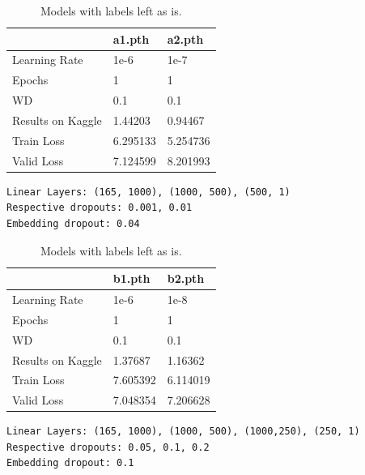 \documentclass[10pt,twocolumn,letterpaper]{article}
\begin{document}
\begin{table}[]
  \begin{center}
    \tabcolsep=0.11cm
    \begin{tabular}{|l|l|l|}
    \hline
                      & a1.pth   & a2.pth   \\ \hline
    Learning Rate     & 1e-6     & 1e-7     \\ \hline
    Epochs            & 1        & 1        \\ \hline
    WD                & 0.1      & 0.1      \\ \hline
    Results on Kaggle & 1.44203  & 0.94467  \\ \hline
    Train Loss        & 6.295133 & 5.254736 \\ \hline
    Valid Loss        & 7.124599 & 8.201993 \\ \hline
    \end{tabular}
    {\scriptsize
    \begin{verbatim}
Linear Layers: (165, 1000), (1000, 500), (500, 1)
Respective dropouts: 0.001, 0.01
Embedding dropout: 0.04
    \end{verbatim}}
  \end{center}
  \caption{Models with labels left as is.}
\end{table}

\begin{table}[]
  \begin{center}
    \tabcolsep=0.11cm
    \begin{tabular}{|l|l|l|}
    \hline
                      & b1.pth   & b2.pth   \\ \hline
    Learning Rate     & 1e-6     & 1e-8     \\ \hline
    Epochs            & 1        & 1        \\ \hline
    WD                & 0.1      & 0.1      \\ \hline
    Results on Kaggle & 1.37687  & 1.16362  \\ \hline
    Train Loss        & 7.605392 & 6.114019 \\ \hline
    Valid Loss        & 7.048354 & 7.206628 \\ \hline
    \end{tabular}
    {\scriptsize
    \begin{verbatim}
Linear Layers: (165, 1000), (1000, 500), (1000,250), (250, 1)
Respective dropouts: 0.05, 0.1, 0.2
Embedding dropout: 0.1
    \end{verbatim}}
  \end{center}
  \caption{Models with labels left as is.}
\end{table}
\end{document}
